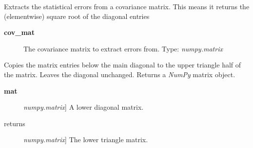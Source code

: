 \documentclass[a4paper,10pt,english]{sphinxmanual}
\begin{document}
\begin{fulllineitems}
\label{index:kafe.numeric_tools.extract_statistical_errors}
Extracts the statistical errors from a covariance matrix. This means
it returns the (elementwise) square root of the diagonal entries
\begin{description}
\item[{\textbf{cov\_mat}}] \leavevmode
The covariance matrix to extract errors from. Type: \emph{numpy.matrix}

\end{description}

\end{fulllineitems}


\begin{fulllineitems}
\label{index:kafe.numeric_tools.make_symmetric_lower}
Copies the matrix entries below the main diagonal to the upper triangle
half of the matrix. Leaves the diagonal unchanged. Returns a \emph{NumPy} matrix
object.
\begin{description}
\item[{\textbf{mat}}] \leavevmode{[}\emph{numpy.matrix}{]}
A lower diagonal matrix.

\item[{returns}] \leavevmode{[}\emph{numpy.matrix}{]}
The lower triangle matrix.

\end{description}

\end{fulllineitems}

\end{document}
